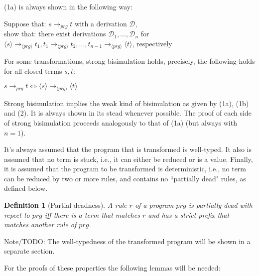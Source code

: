 \documentclass[11pt]{article} %
\newtheorem{definition}{Definition}
\begin{document}
(1a) is always shown in the following way:

Suppose that: $s \longrightarrow_{prg} t$ with a derivation $\mathcal{D}$, \\
show that: there exist derivations $\mathcal{D}_1, ..., \mathcal{D}_n$ for $\langle s \rangle \longrightarrow_{\langle prg \rangle} t_1, t_1 \longrightarrow_{\langle prg \rangle} t_2, ..., t_{n-1} \longrightarrow_{\langle prg \rangle} \langle t \rangle$, respectively

For some transformations, strong bisimulation holds, precisely, the following holds for all closed terms $s, t$:

$ s \longrightarrow_{prg} t \iff \langle s \rangle \longrightarrow_{\langle prg \rangle} \langle t \rangle$

Strong bisimulation implies the weak kind of bisimulation as given by (1a), (1b) and (2). It is always shown in its stead whenever possible. The proof of each side of strong bisimulation proceeds analogously to that of (1a) (but always with $n = 1$).

It's always assumed that the program that is transformed is well-typed. It also is assumed that no term is stuck, i.e., it can either be reduced or is a value. Finally, it is assumed that the program to be transformed is deterministic, i.e., no term can be reduced by two or more rules, and contains no ``partially dead" rules, as defined below.

\begin{definition}[Partial deadness] A rule $r$ of a program $prg$ is partially dead with repect to $prg$ iff there is a term that matches $r$ and has a strict prefix that matches another rule of $prg$.
\end{definition}

Note/TODO: The well-typedness of the transformed program will be shown in a separate section.

For the proofs of these properties the following lemmas will be needed:
\end{document}
